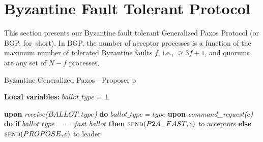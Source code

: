 \documentclass[algorithms,article,accept,moreauthors,pdftex,10pt,a4paper]{Definitions/mdpi}
\begin{document}
%

\section{Byzantine Fault Tolerant Protocol}
\label{sec:bft}
%
This section presents our Byzantine fault tolerant Generalized Paxos
Protocol (or BGP, for~short). 
In BGP, the number of acceptor processes is a function of the maximum number of tolerated Byzantine faults $f$, i.e., $\geq 3f+1$, and quorums are any set of 
$N-f$ processes.

\begin{algorithm}[H]
\caption{Byzantine Generalized Paxos---Proposer p}
\label{BFT-Prop}
\textbf{Local variables:} $ballot\_type = \bot$
\begin{algorithmic}[1] 
\State \textbf{upon} \textit{receive($BALLOT, type$)} \textbf{do} 
\State \hspace{\algorithmicindent} $ballot\_type = type$
\State
\State \textbf{upon} \textit{command\_request($c$)} \textbf{do} \hspace{\algorithmicindent}\hspace{\algorithmicindent}\hspace{\algorithmicindent}\hspace{\algorithmicindent}
\State \hspace{\algorithmicindent} \textbf{if} $ballot\_type == fast\_ballot$ \textbf{then}
\State \hspace{\algorithmicindent}\hspace{\algorithmicindent} $\Call{send}{P2A\_FAST, c}$ to acceptors
\State \hspace{\algorithmicindent} \textbf{else} 
\State \hspace{\algorithmicindent}\hspace{\algorithmicindent} $\Call{send}{PROPOSE, c}$ to leader
\end{algorithmic}
\end{algorithm}
\end{document}
